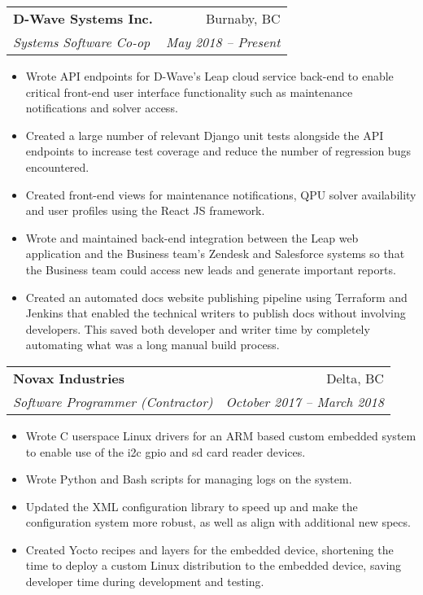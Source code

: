 \documentclass[letterpaper,11pt]{article}
\makeatletter
\newcommand{\resumeItem}[2]{
  \item\small{
    \textbf{#1}{#2 \vspace{-2pt}}
  }
}
\newcommand{\resumeSubheading}[4]{
  \vspace{-1pt}\item
    \begin{tabular*}{0.97\textwidth}[t]{l@{\extracolsep{\fill}}r}
      \textbf{#1} & #2 \\
      \textit{\small#3} & \textit{\small #4} \\
    \end{tabular*}\vspace{-5pt}
}
\newcommand{\resumeItemListStart}{\begin{itemize}}
\newcommand{\resumeItemListEnd}{\end{itemize}\vspace{-5pt}}
\makeatother
\begin{document}
    \resumeSubheading
      {D-Wave Systems Inc.}{Burnaby, BC}
      {Systems Software Co-op}{May 2018 -- Present}
      \resumeItemListStart
        \resumeItem{} {Wrote API endpoints for D-Wave's Leap cloud service back-end to enable critical front-end user interface functionality such as maintenance notifications and solver access.}
        \resumeItem{} {Created a large number of relevant Django unit tests alongside the API endpoints to increase test coverage and reduce the number of regression bugs encountered.}
        \resumeItem{} {Created front-end views for maintenance notifications, QPU solver availability and user profiles using the React JS framework.}
        \resumeItem{} {Wrote and maintained back-end integration between the Leap web application and the Business team's Zendesk and Salesforce systems so that the Business team could access new leads and generate important reports.}
        \resumeItem{} {Created an automated docs website publishing pipeline using Terraform and Jenkins that enabled the technical writers to publish docs without involving developers. This saved both developer and writer time by completely automating what was a long manual build process.}
      \resumeItemListEnd

    \resumeSubheading
      {Novax Industries}{Delta, BC}
      {Software Programmer (Contractor)}{October 2017 -- March 2018}
      \resumeItemListStart
        \resumeItem{} {Wrote C userspace Linux drivers for an ARM based custom embedded system to enable use of the i2c gpio and sd card reader devices.}
        \resumeItem{} {Wrote Python and Bash scripts for managing logs on the system.}
        \resumeItem{} {Updated the XML configuration library to speed up and make the configuration system more robust, as well as align with additional new specs.}
        \resumeItem{} {Created Yocto recipes and layers for the embedded device, shortening the time to deploy a custom Linux distribution to the embedded device, saving developer time during development and testing.}
      \resumeItemListEnd
\end{document}
